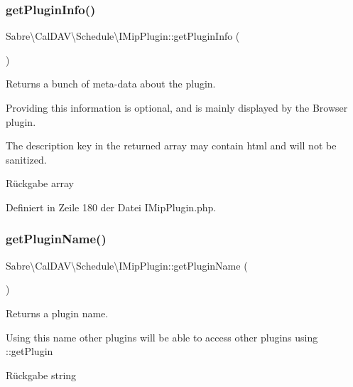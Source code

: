 \subsubsection{\texorpdfstring{get\+Plugin\+Info()}{getPluginInfo()}}
{\footnotesize\ttfamily Sabre\textbackslash{}\+Cal\+D\+A\+V\textbackslash{}\+Schedule\textbackslash{}\+I\+Mip\+Plugin\+::get\+Plugin\+Info (\begin{DoxyParamCaption}{ }\end{DoxyParamCaption})}

Returns a bunch of meta-\/data about the plugin.

Providing this information is optional, and is mainly displayed by the Browser plugin.

The description key in the returned array may contain html and will not be sanitized.

\begin{DoxyReturn}{Rückgabe}
array 
\end{DoxyReturn}


Definiert in Zeile 180 der Datei I\+Mip\+Plugin.\+php.

\mbox{\label{class_sabre_1_1_cal_d_a_v_1_1_schedule_1_1_i_mip_plugin_a7dfd2a619c0bbc08ab94af0d69dc144f}} 
\subsubsection{\texorpdfstring{get\+Plugin\+Name()}{getPluginName()}}
{\footnotesize\ttfamily Sabre\textbackslash{}\+Cal\+D\+A\+V\textbackslash{}\+Schedule\textbackslash{}\+I\+Mip\+Plugin\+::get\+Plugin\+Name (\begin{DoxyParamCaption}{ }\end{DoxyParamCaption})}

Returns a plugin name.

Using this name other plugins will be able to access other plugins using \+::get\+Plugin

\begin{DoxyReturn}{Rückgabe}
string 
\end{DoxyReturn}


